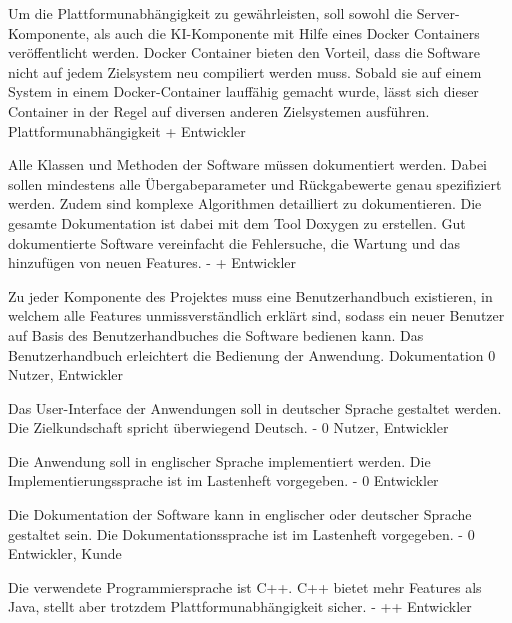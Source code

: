         {Um die Plattformunabhängigkeit zu gewährleisten, soll sowohl die Server-Komponente, als auch die KI-Komponente mit Hilfe eines Docker Containers veröffentlicht werden.}
        {Docker Container bieten den Vorteil, dass die Software nicht auf jedem Zielsystem neu compiliert werden muss. Sobald sie auf einem System in einem Docker-Container lauffähig gemacht wurde, lässt sich dieser Container in der Regel auf diversen anderen Zielsystemen ausführen.}
        {Plattformunabhängigkeit}
        {+}
        {Entwickler}

        {Alle Klassen und Methoden der Software müssen dokumentiert werden. Dabei sollen mindestens alle Übergabeparameter und Rückgabewerte genau spezifiziert werden. Zudem sind komplexe Algorithmen detailliert zu dokumentieren. Die gesamte Dokumentation ist dabei mit dem Tool Doxygen zu erstellen.}
        {Gut dokumentierte Software vereinfacht die Fehlersuche, die Wartung und das hinzufügen von neuen Features.}
        {-}
        {+}
        {Entwickler}

        {Zu jeder Komponente des Projektes muss eine Benutzerhandbuch existieren, in welchem alle Features unmissverständlich erklärt sind, sodass ein neuer Benutzer auf Basis des Benutzerhandbuches die Software bedienen kann.}
        {Das Benutzerhandbuch erleichtert die Bedienung der Anwendung.}
        {Dokumentation}
        {0}
        {Nutzer, Entwickler}

        {Das User-Interface der Anwendungen soll in deutscher Sprache gestaltet werden.}
        {Die Zielkundschaft spricht überwiegend Deutsch.}
        {-}
        {0}
        {Nutzer, Entwickler}

        {Die Anwendung soll in englischer Sprache implementiert werden.}
        {Die Implementierungssprache ist im Lastenheft vorgegeben.}
        {-}
        {0}
        {Entwickler}

        {Die Dokumentation der Software kann in englischer oder deutscher Sprache gestaltet sein.}
        {Die Dokumentationssprache ist im Lastenheft vorgegeben.}
        {-}
        {0}
        {Entwickler, Kunde}

        {Die verwendete Programmiersprache ist C++.}
        {C++ bietet mehr Features als Java, stellt aber trotzdem Plattformunabhängigkeit sicher.}
        {-}
        {++}
        {Entwickler}	

